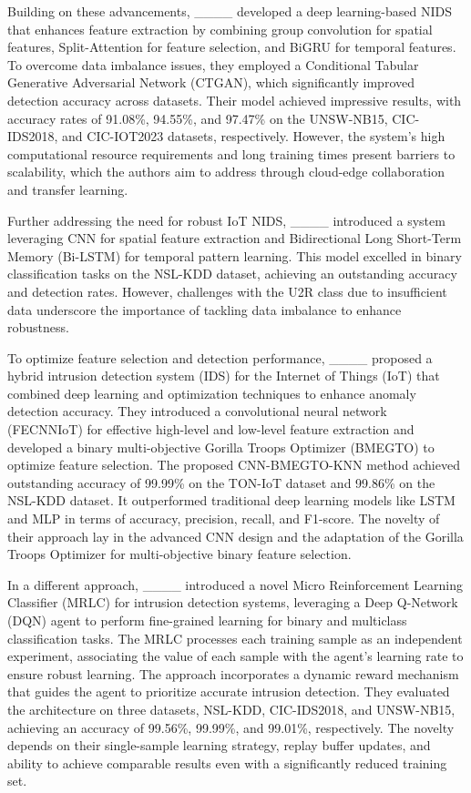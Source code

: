 Building on these advancements, ____ developed a deep learning-based NIDS that enhances feature extraction by combining group convolution for spatial features, Split-Attention for feature selection, and BiGRU for temporal features. To overcome data imbalance issues, they employed a Conditional Tabular Generative Adversarial Network (CTGAN), which significantly improved detection accuracy across datasets. Their model achieved impressive results, with accuracy rates of 91.08\%, 94.55\%, and 97.47\% on the UNSW-NB15, CIC-IDS2018, and CIC-IOT2023 datasets, respectively. However, the system's high computational resource requirements and long training times present barriers to scalability, which the authors aim to address through cloud-edge collaboration and transfer learning.

Further addressing the need for robust IoT NIDS, ____ introduced a system leveraging CNN for spatial feature extraction and Bidirectional Long Short-Term Memory (Bi-LSTM) for temporal pattern learning. This model excelled in binary classification tasks on the NSL-KDD dataset, achieving an outstanding accuracy and detection rates. However, challenges with the U2R class due to insufficient data underscore the importance of tackling data imbalance to enhance robustness.

To optimize feature selection and detection performance, ____ proposed a hybrid intrusion detection system (IDS) for the Internet of Things (IoT) that combined deep learning and optimization techniques to enhance anomaly detection accuracy. They introduced a convolutional neural network (FECNNIoT) for effective high-level and low-level feature extraction and developed a binary multi-objective Gorilla Troops Optimizer (BMEGTO) to optimize feature selection. The proposed CNN-BMEGTO-KNN method achieved outstanding accuracy of 99.99\% on the TON-IoT dataset and 99.86\% on the NSL-KDD dataset. It outperformed traditional deep learning models like LSTM and MLP in terms of accuracy, precision, recall, and F1-score. The novelty of their approach lay in the advanced CNN design and the adaptation of the Gorilla Troops Optimizer for multi-objective binary feature selection.

In a different approach, ____ introduced a novel Micro Reinforcement Learning Classifier (MRLC) for intrusion detection systems, leveraging a Deep Q-Network (DQN) agent to perform fine-grained learning for binary and multiclass classification tasks. The MRLC processes each training sample as an independent experiment, associating the value of each sample with the agent's learning rate to ensure robust learning. The approach incorporates a dynamic reward mechanism that guides the agent to prioritize accurate intrusion detection. They evaluated the architecture on three datasets, NSL-KDD, CIC-IDS2018, and UNSW-NB15, achieving an accuracy of 99.56\%, 99.99\%, and 99.01\%, respectively. The novelty depends on their single-sample learning strategy, replay buffer updates, and ability to achieve comparable results even with a significantly reduced training set.

